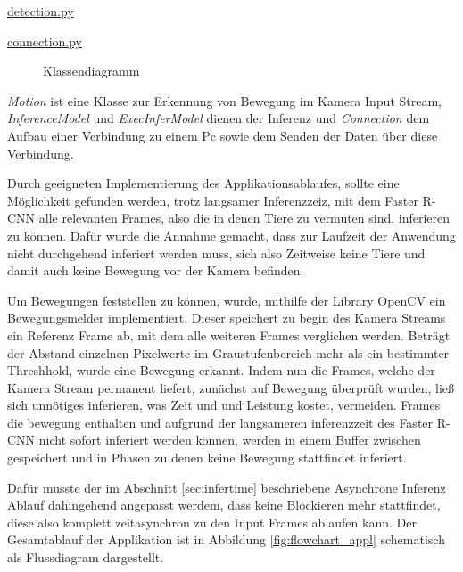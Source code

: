 \vspace{1cm}
\begin{minipage}{0.75\textwidth}
    \centering
    \underline{detection.py}
\end{minipage}
\begin{minipage}{0.25\textwidth}
    \centering
    \underline{connection.py}
\end{minipage}
\begin{figure}[H]
    \centering
        
    \caption{Klassendiagramm}
    \label{fig:class_diagram}
\end{figure}
\vspace{1cm}


\textit{Motion} ist eine Klasse zur Erkennung von Bewegung im Kamera 
Input Stream, \textit{InferenceModel} und \textit{ExecInferModel} 
dienen der Inferenz und \textit{Connection} dem Aufbau einer
Verbindung zu einem Pc sowie dem Senden der Daten über diese Verbindung.

Durch geeigneten Implementierung des Applikationsablaufes,
sollte eine Möglichkeit gefunden werden, trotz langsamer Inferenzzeiz,
mit dem Faster R-CNN alle relevanten Frames, 
also die in denen Tiere zu vermuten sind, inferieren zu können.
Dafür wurde die Annahme gemacht, dass zur Laufzeit der 
Anwendung nicht durchgehend inferiert werden muss,
sich also Zeitweise keine Tiere und damit auch keine 
Bewegung vor der Kamera befinden.

Um Bewegungen feststellen zu können, 
wurde, mithilfe der Library OpenCV ein Bewegungsmelder 
implementiert.
Dieser speichert zu begin des Kamera Streams ein Referenz
Frame ab, mit dem alle weiteren Frames verglichen werden.
Beträgt der Abstand einzelnen Pixelwerte im 
Graustufenbereich mehr als ein bestimmter 
Threshhold, wurde eine Bewegung erkannt.
Indem nun die Frames, welche der Kamera Stream permanent 
liefert, zunächst auf Bewegung überprüft wurden, 
ließ sich unnötiges inferieren, was Zeit und 
und Leistung kostet, vermeiden.
Frames die bewegung enthalten und aufgrund der langsameren 
inferenzzeit des Faster R-CNN nicht sofort inferiert 
werden können, werden in einem Buffer zwischen 
gespeichert und in Phasen zu denen keine Bewegung stattfindet 
inferiert.

Dafür musste der im Abschnitt \ref{sec:infertime} beschriebene
Asynchrone Inferenz Ablauf dahingehend angepasst werdem, dass 
keine Blockieren mehr stattfindet, diese also komplett 
zeitasynchron zu den Input Frames ablaufen kann.
Der Gesamtablauf der Applikation ist in Abbildung 
\ref{fig:flowchart_appl} 
schematisch als Flussdiagram dargestellt.



